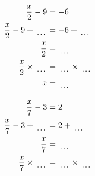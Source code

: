 \documentclass[12pt]{article}
\newcounter{minipagecount}
\begin{document}
\begin{multicols}{2}
\begin{minipage}[t]{0.45\textwidth}
    \raggedright %
    \begin{align*} %
        \frac{x}{2} - 9 &= -6\\
        \frac{x}{2} - 9 + \dotuline{\hspace{5mm}} &= -6 + \dotuline{\hspace{5mm}}\\
        \frac{x}{2} &= \dotuline{\hspace{5mm}}\\
        \frac{x}{2} \times\dotuline{\hspace{5mm}} &= \dotuline{\hspace{5mm}} \times\dotuline{\hspace{5mm}}\\
        x &= \dotuline{\hspace{5mm}}\\
    \end{align*}
\end{minipage} %
\noindent{(\theminipagecount)}\hspace{0.1mm} %
\begin{minipage}[t]{0.45\textwidth} %
    \vspace{-26pt}  %
    \raggedright %
    \begin{align*} %
        \frac{x}{7} - 3 &= 2\\
        \frac{x}{7} - 3 + \dotuline{\hspace{5mm}} &= 2 + \dotuline{\hspace{5mm}}\\
        \frac{x}{7} &= \dotuline{\hspace{5mm}}\\
        \frac{x}{7} \times\dotuline{\hspace{5mm}} &= \dotuline{\hspace{5mm}} \times\dotuline{\hspace{5mm}}\\

\end{align*}
\end{minipage}
\end{multicols}
\end{document}
